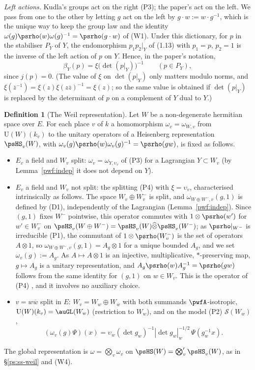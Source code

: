 \documentclass[10pt]{amsart}
\theoremstyle{definition}
\newtheorem{definition}[theorem]{Definition}
\theoremstyle{remark}
\providecommand{\auS}{\mathcal S}
\providecommand{\auU}{\mathrm U}
\providecommand{\aubar}[1]{\overline{#1}}
\begin{document}
\emph{Left actions.} Kudla's groups act on the right (P3); the paper's act on the left. We pass from
one to the other by letting $g$ act on the left by $g\cdot w:=w\cdot g^{-1}$, which is the unique
way to keep the group law and the identity $\omega(g)\psrho(w)\omega(g)^{-1}=\psrho(g\cdot w)$ of
(W1). Under this dictionary, for $p$ in the stabiliser $P_Y$ of $Y$, the endomorphism $p_1p_2|_Y$
of (1.13) with $p_1=p$, $p_2=1$ is the inverse of the left action of $p$ on $Y$. Hence, in the
paper's notation,
\begin{equation}\label{pwf:eq-xP}
\beta_Y(p)=\xi\bigl(\det(p|_Y)\bigr)^{-1}\qquad(p\in P_Y),
\end{equation}
since $j(p)=0$. (The value of $\xi$ on $\det(p|_Y)$ only matters modulo norms, and $\xi(\aubar
z^{-1})=\xi(z)\xi(z\aubar z)^{-1}=\xi(z)$; so the same value is obtained if $\det(p|_Y)$ is replaced
by the determinant of $p$ on a complement of $Y$ dual to $Y$.)

\begin{definition}[The Weil representation]\label{pwf:def}
Let $W$ be a non-degenerate hermitian space over $E$. For each place $v$ of $k$ a homomorphism
$\omega_v=\omega_{W,v}$ from $\auU(W)(k_v)$ to the unitary operators of a Heisenberg representation
$\psHS_v(W)$, with $\omega_v(g)\psrho(w)\omega_v(g)^{-1}=\psrho(gw)$, is fixed as follows.
\begin{itemize}
\item[(D1)] $E_v$ a field and $W_v$ split: $\omega_v=\omega_{Y,\upsilon_v}$ of (P3) for a Lagrangian
$Y\subset W_v$ (by Lemma~\ref{pwf:indep} it does not depend on $Y$).
\item[(D2)] $E_v$ a field and $W_v$ not split: the splitting (P4) with $\xi=\upsilon_v$, characterised
intrinsically as follows. The space $W_v\oplus W_v^-$ is split, and $\omega_{W\oplus W^-,v}(g,1)$ is
defined by (D1), independently of the Lagrangian (Lemma~\ref{pwf:indep}). Since $(g,1)$ fixes $W^-$
pointwise, this operator commutes with $1\otimes\psrho(w')$ for $w'\in W^-_v$ on
$\psHS_v(W\oplus W^-)=\psHS_v(W)\widehat\otimes\psHS_v(W^-)$; as $\psrho|_{W^-}$ is irreducible (P1),
the commutant of $1\otimes\psrho(W^-_v)$ is the set of operators $A\otimes1$, so
$\omega_{W\oplus W^-,v}(g,1)=A_g\otimes1$ for a unique bounded $A_g$, and we set $\omega_v(g):=A_g$.
As $A\mapsto A\otimes1$ is an injective, multiplicative, $*$-preserving map, $g\mapsto A_g$ is a
unitary representation, and $A_g\psrho(w)A_g^{-1}=\psrho(gw)$ follows from the same identity for
$(g,1)$ on $w\in W_v$. This is the operator of (P4) \cite[(4.1)--(4.5), Proposition~4.1]{KudlaSplitting},
and it involves no auxiliary choice.
\item[(D3)] $v=w\aubar w$ split in $E$: $W_v=W_w\oplus W_{\aubar w}$ with both summands
$\pwfA$-isotropic, $\auU(W)(k_v)=\auGL(W_w)$ (restriction to $W_w$), and on the model (P2)
$\auS(W_w)$,
\[
(\omega_v(g)\Psi)(x)=\upsilon_w(\det g_w)^{-1}|\det g_w|_w^{-1/2}\,\Psi(g_w^{-1}x).
\]
\end{itemize}
The global representation is $\omega=\bigotimes_v\omega_v$ on $\psHS(W)=\bigotimes'_v\psHS_v(W)$, as
in \S\ref{ps:ss-weil} and (W4).
\end{definition}
\end{document}
